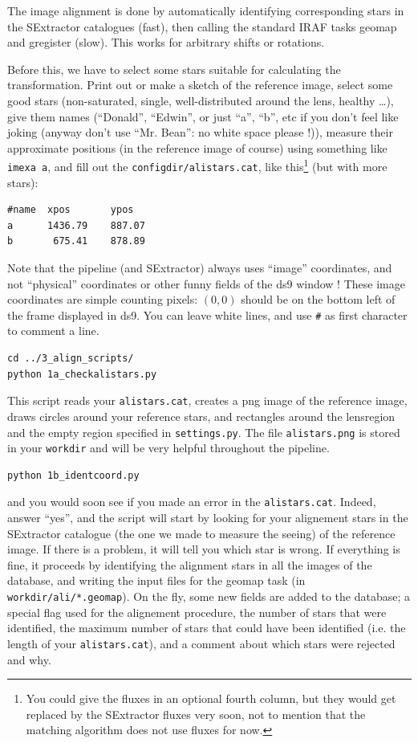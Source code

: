 The image alignment is done by automatically identifying corresponding stars in the SExtractor catalogues (fast), then calling the standard IRAF tasks geomap and gregister (slow). This works for arbitrary shifts or rotations.

Before this, we have to select some stars suitable for calculating the transformation. Print out or make a sketch of the reference image, select some good stars (non-saturated, single, well-distributed around the lens, healthy \ldots), give them names (``Donald'', ``Edwin'', or just ``a'', ``b'', etc if you don't feel like joking (anyway don't use ``Mr. Bean'': no white space please !)), measure their approximate positions (in the reference image of course) using something like \verb+imexa a+, and fill out the \verb+configdir/alistars.cat+, like this\footnote{You could give the fluxes in an optional fourth column, but they would get replaced by the SExtractor fluxes very soon, not to mention that the matching algorithm does not use fluxes for now.} (but with more stars):

\begin{Verbatim}[fontsize=\relsize{-2}]
#name  xpos       ypos
a      1436.79    887.07
b       675.41    878.89
\end{Verbatim}

Note that the pipeline (and SExtractor) always uses ``image'' coordinates, and not ``physical'' coordinates or other funny fields of the ds9 window ! These image coordinates are simple counting pixels: $(0,0)$ should be on the bottom left of the frame displayed in ds9.
You can leave white lines, and use \verb+#+ as first character to comment a line. 

\begin{Verbatim}
cd ../3_align_scripts/
python 1a_checkalistars.py
\end{Verbatim}
This script reads your \verb+alistars.cat+, creates a png image of the reference image, draws circles around your reference stars, and rectangles around the lensregion and the empty region specified in \verb+settings.py+. The file \verb+alistars.png+ is stored in your \verb+workdir+ and will be very helpful throughout the pipeline.

\begin{Verbatim}
python 1b_identcoord.py
\end{Verbatim}
and you would soon see if you made an error in the \verb+alistars.cat+. Indeed, answer ``yes'', and the script will start by looking for your alignement stars in the SExtractor catalogue (the one we made to measure the seeing) of the reference image. If there is a problem, it will tell you which star is wrong. If everything is fine, it proceeds by identifying the alignment stars in all the images of the database, and writing the input files for the geomap task (in \verb+workdir/ali/*.geomap+). On the fly, some new fields are added to the database; a special flag used for the alignement procedure, the number of stars that were identified, the maximum number of stars that could have been identified (i.e. the length of your \verb+alistars.cat+), and a comment about which stars were rejected and why.

